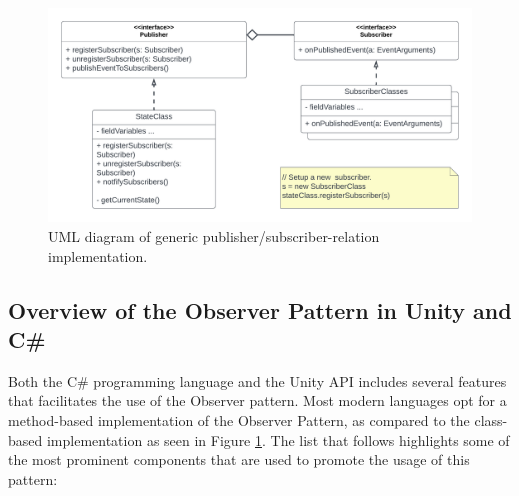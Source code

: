     \begin{figure}[H]
      \centering
      \includegraphics[scale=0.75]{Project_report/figures/theory/design_patterns/observer_uml.png}
      \caption{UML diagram of generic publisher/subscriber-relation implementation.}
      \label{fig:observer_uml}
    \end{figure}

\subsection{Overview of the Observer Pattern in Unity and C\#}
    Both the C\# programming language and the Unity API includes several features that facilitates the use of the Observer pattern. Most modern languages opt for a method-based implementation of the Observer Pattern, as compared to the class-based implementation as seen in Figure \ref{fig:observer_uml}. The list that follows highlights some of the most prominent components that are used to promote the usage of this pattern:

